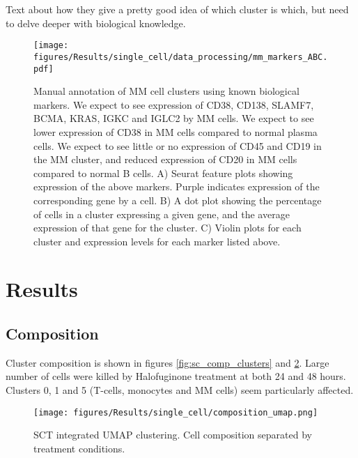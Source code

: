 Text about how they give a pretty good idea of which cluster is which, but need to delve deeper with biological knowledge.



\begin{figure}[p]
    \centering
    \texttt{[image: figures/Results/single\_cell/data\_processing/mm\_markers\_ABC.pdf]}
    \caption[Manual annotation of MM cells]{Manual annotation of MM cell clusters using known biological markers.
    We expect to see expression of CD38, CD138, SLAMF7, BCMA, KRAS, IGKC and IGLC2 by MM cells.
    We expect to see lower expression of CD38 in MM cells compared to normal plasma cells.
    We expect to see little or no expression of CD45 and CD19 in the MM cluster, and reduced expression of CD20 in MM cells compared to normal B cells.
    A) Seurat feature plots showing expression of the above markers.
    Purple indicates expression of the corresponding gene by a cell.
    B) A dot plot showing the percentage of cells in a cluster expressing a given gene, and the average expression of that gene for the cluster.
    C) Violin plots for each cluster and expression levels for each marker listed above.  }
    \label{fig:mm_markers}
\end{figure}



\clearpage
\section{Results}

\subsection{Composition}
Cluster composition is shown in figures \ref{fig:sc_comp_clusters} and \ref{fig:sc_umap_comp}.
Large number of cells were killed by Halofuginone treatment at both 24 and 48 hours.
Clusters 0, 1 and 5 (T-cells, monocytes and MM cells) seem particularly affected.

\begin{figure}[htb]
\centering
\texttt{[image: figures/Results/single\_cell/composition\_umap.png]}
\caption[UMAP cluster composition]{SCT integrated UMAP clustering. Cell composition separated by treatment conditions. }
\label{fig:sc_umap_comp}
\end{figure}



